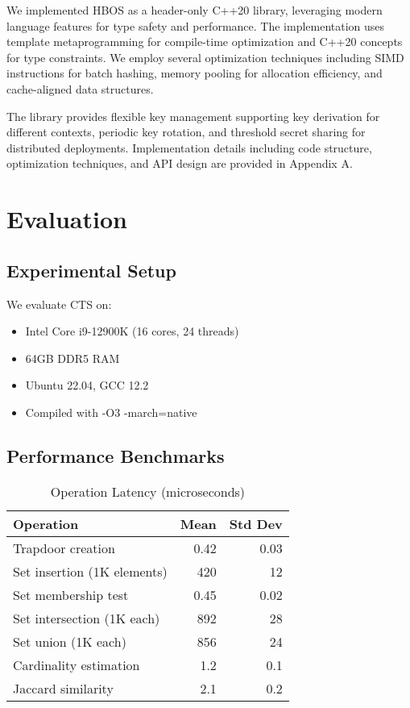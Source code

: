 \documentclass[10pt,conference]{IEEEtran}
\begin{document}
We implemented HBOS as a header-only C++20 library, leveraging modern language features for type safety and performance. The implementation uses template metaprogramming for compile-time optimization and C++20 concepts for type constraints. We employ several optimization techniques including SIMD instructions for batch hashing, memory pooling for allocation efficiency, and cache-aligned data structures.

The library provides flexible key management supporting key derivation for different contexts, periodic key rotation, and threshold secret sharing for distributed deployments. Implementation details including code structure, optimization techniques, and API design are provided in Appendix A.

\section{Evaluation}
\label{sec:evaluation}

\subsection{Experimental Setup}

We evaluate CTS on:
\begin{itemize}
\item Intel Core i9-12900K (16 cores, 24 threads)
\item 64GB DDR5 RAM
\item Ubuntu 22.04, GCC 12.2
\item Compiled with -O3 -march=native
\end{itemize}

\subsection{Performance Benchmarks}

\begin{table}[h]
\centering
\caption{Operation Latency (microseconds)}
\label{tab:performance}
\begin{tabular}{lrr}
\toprule
Operation & Mean & Std Dev \\
\midrule
Trapdoor creation & 0.42 & 0.03 \\
Set insertion (1K elements) & 420 & 12 \\
Set membership test & 0.45 & 0.02 \\
Set intersection (1K each) & 892 & 28 \\
Set union (1K each) & 856 & 24 \\
Cardinality estimation & 1.2 & 0.1 \\
Jaccard similarity & 2.1 & 0.2 \\
\bottomrule
\end{tabular}
\end{table}
\end{document}
